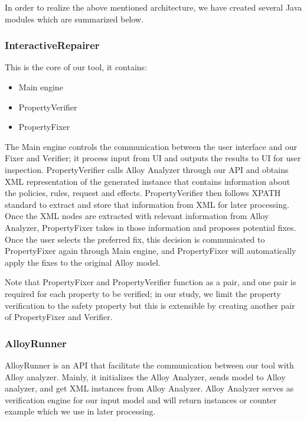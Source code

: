 \documentclass{acm_proc_article-sp}
\begin{document}
In order to realize the above mentioned architecture, we have created several Java modules which are summarized below.

\subsubsection{InteractiveRepairer}
This is the core of our tool, it contains:
\begin{itemize}
\item Main engine
\item PropertyVerifier
\item PropertyFixer
\end{itemize}
The Main engine controls the communication between the user interface and our Fixer and Verifier; it process input from UI and outputs the results to UI for user inspection. PropertyVerifier calls Alloy Analyzer through our API and obtains XML representation of the generated instance that contains information about the policies, rules, request and effects. PropertyVerifier then follows XPATH standard to extract and store that information from XML for later processing. Once the XML nodes are extracted with relevant information from Alloy Analyzer, PropertyFixer takes in those information and proposes potential fixes. Once the user selects the preferred fix, this decision is communicated to PropertyFixer again through Main engine, and PropertyFixer will automatically apply the fixes to the original Alloy model.

Note that PropertyFixer and PropertyVerifier function as a pair, and one pair is required for each property to be verified; in our study, we limit the property verification to the safety property but this is extensible by creating another pair of PropertyFixer and Verifier.

\subsubsection{AlloyRunner}
AlloyRunner is an API that facilitate the communication between our tool with Alloy analyzer. Mainly, it initializes the Alloy Analyzer, sends model to Alloy analyzer, and get XML instances from Alloy Analyzer. Alloy Analyzer serves as verification engine for our input model and will return instances or counter example which we use in later processing.
\end{document}
